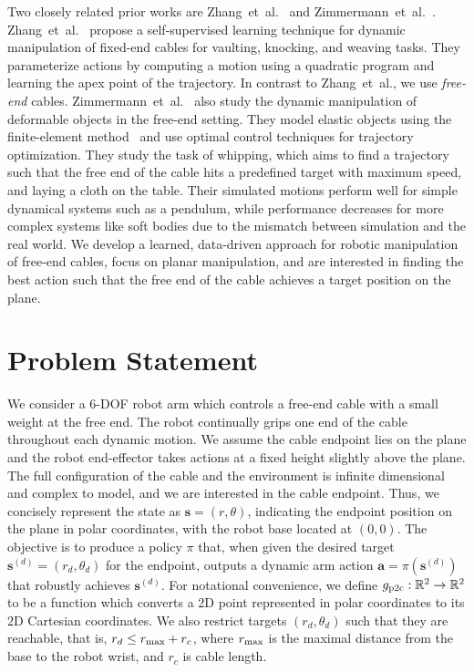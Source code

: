 \documentclass[letterpaper, 10 pt, conference]{ieeeconf}  %
\newcommand{\ba}{\mathbf{a}}
\newcommand{\state}{\mathbf{s}}
\newcommand{\KG}[2]{{\color{red} \bf [#2 (per KG #1)]}}
\begin{document}
Two closely related prior works are Zhang~et~al.~\cite{harry_rope_2021} and Zimmermann~et~al.~\cite{zimmermanndynamic}. Zhang~et~al.~\cite{harry_rope_2021} propose a self-supervised learning technique for dynamic manipulation of fixed-end cables for vaulting, knocking, and weaving tasks. They parameterize actions by computing a motion using a quadratic program and learning the apex point of the trajectory. In contrast to Zhang~et~al., we use \emph{free-end} cables. Zimmermann~et~al.~\cite{zimmermanndynamic} also study the dynamic manipulation of deformable objects in the free-end setting. They model elastic objects using the finite-element method~\cite{bathe2006finite} and use optimal control techniques for trajectory optimization. They study the task of whipping, which aims to find a trajectory such that the free end of the cable hits a predefined target with maximum speed, and laying a cloth on the table. Their simulated motions perform well for simple dynamical systems such as a pendulum, while
performance decreases for more complex systems like soft bodies due to the mismatch between simulation and the real world. We develop a learned, data-driven approach for robotic manipulation of free-end cables, focus on planar manipulation, and are interested in finding the best action such that the free end of the cable achieves a target position on the plane.

\section{Problem Statement}\label{sec:PS}

We consider a 6-DOF robot arm which controls a free-end cable with a small weight at the free end. The robot continually grips one end of the cable throughout each dynamic motion. We assume the cable endpoint lies on the plane and the robot end-effector takes actions at a fixed height slightly above the plane. The full configuration of the cable and the environment is infinite dimensional and complex to model, and we are interested in the cable endpoint. Thus, we concisely represent the state as ${\state=(r, \theta)}$, indicating the endpoint position on the plane in polar coordinates, with the robot base located at $(0, 0)$. The objective is to produce a policy $\pi$ that, when given the desired target ${\state^{(d)}=(r_d, \theta_d)}$ for the endpoint, outputs a dynamic arm action ${\ba=\pi(\state^{(d)})}$ that robustly achieves $\state^{(d)}$.
For notational convenience, we define $g_{\rm p2c} : \mathbb{R}^2 \to \mathbb{R}^2$ to be a function which converts a 2D point represented in polar coordinates to its 2D Cartesian coordinates. We also restrict targets $(r_d, \theta_d)$ such that they are reachable, that is, $r_d \leq r_{\rm max} + r_c$, where $r_{\rm max}$ is the maximal distance from the base to the robot wrist, and $r_c$ is cable length.
\end{document}
